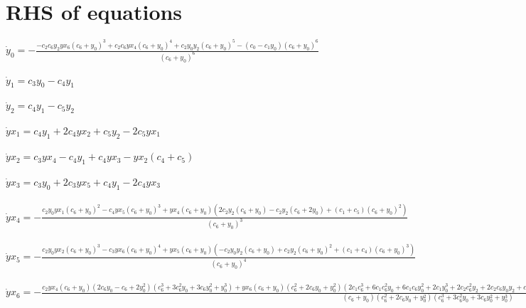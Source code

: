 \documentclass{article}
\begin{document}
\section*{RHS of equations}
$\dot y_{0} = - \frac{- c_{2} c_{6} y_{2} yx_{6} \left(c_{6} + y_{0}\right)^{3} + c_{2} c_{6} yx_{4} \left(c_{6} + y_{0}\right)^{4} + c_{2} y_{0} y_{2} \left(c_{6} + y_{0}\right)^{5} - \left(c_{0} - c_{1} y_{0}\right) \left(c_{6} + y_{0}\right)^{6}}{\left(c_{6} + y_{0}\right)^{6}}$\\\\$\dot y_{1} = c_{3} y_{0} - c_{4} y_{1}$\\\\$\dot y_{2} = c_{4} y_{1} - c_{5} y_{2}$\\\\$\dot yx_{1} = c_{4} y_{1} + 2 c_{4} yx_{2} + c_{5} y_{2} - 2 c_{5} yx_{1}$\\\\$\dot yx_{2} = c_{3} yx_{4} - c_{4} y_{1} + c_{4} yx_{3} - yx_{2} \left(c_{4} + c_{5}\right)$\\\\$\dot yx_{3} = c_{3} y_{0} + 2 c_{3} yx_{5} + c_{4} y_{1} - 2 c_{4} yx_{3}$\\\\$\dot yx_{4} = - \frac{c_{2} y_{0} yx_{1} \left(c_{6} + y_{0}\right)^{2} - c_{4} yx_{5} \left(c_{6} + y_{0}\right)^{3} + yx_{4} \left(c_{6} + y_{0}\right) \left(2 c_{2} y_{2} \left(c_{6} + y_{0}\right) - c_{2} y_{2} \left(c_{6} + 2 y_{0}\right) + \left(c_{1} + c_{5}\right) \left(c_{6} + y_{0}\right)^{2}\right)}{\left(c_{6} + y_{0}\right)^{3}}$\\\\$\dot yx_{5} = - \frac{c_{2} y_{0} yx_{2} \left(c_{6} + y_{0}\right)^{3} - c_{3} yx_{6} \left(c_{6} + y_{0}\right)^{4} + yx_{5} \left(c_{6} + y_{0}\right) \left(- c_{2} y_{0} y_{2} \left(c_{6} + y_{0}\right) + c_{2} y_{2} \left(c_{6} + y_{0}\right)^{2} + \left(c_{1} + c_{4}\right) \left(c_{6} + y_{0}\right)^{3}\right)}{\left(c_{6} + y_{0}\right)^{4}}$\\\\$\dot yx_{6} = - \frac{c_{2} yx_{4} \left(c_{6} + y_{0}\right) \left(2 c_{6} y_{0} - c_{6} + 2 y_{0}^{2}\right) \left(c_{6}^{3} + 3 c_{6}^{2} y_{0} + 3 c_{6} y_{0}^{2} + y_{0}^{3}\right) + yx_{6} \left(c_{6} + y_{0}\right) \left(c_{6}^{2} + 2 c_{6} y_{0} + y_{0}^{2}\right) \left(2 c_{1} c_{6}^{3} + 6 c_{1} c_{6}^{2} y_{0} + 6 c_{1} c_{6} y_{0}^{2} + 2 c_{1} y_{0}^{3} + 2 c_{2} c_{6}^{2} y_{2} + 2 c_{2} c_{6} y_{0} y_{2} + c_{2} c_{6} y_{2}\right) - \left(c_{6}^{2} + 2 c_{6} y_{0} + y_{0}^{2}\right) \left(c_{6}^{3} + 3 c_{6}^{2} y_{0} + 3 c_{6} y_{0}^{2} + y_{0}^{3}\right) \left(c_{0} c_{6} + c_{0} y_{0} + c_{1} c_{6} y_{0} + c_{1} y_{0}^{2} + c_{2} y_{0} y_{2}\right)}{\left(c_{6} + y_{0}\right) \left(c_{6}^{2} + 2 c_{6} y_{0} + y_{0}^{2}\right) \left(c_{6}^{3} + 3 c_{6}^{2} y_{0} + 3 c_{6} y_{0}^{2} + y_{0}^{3}\right)}$\\\\
\end{document}
